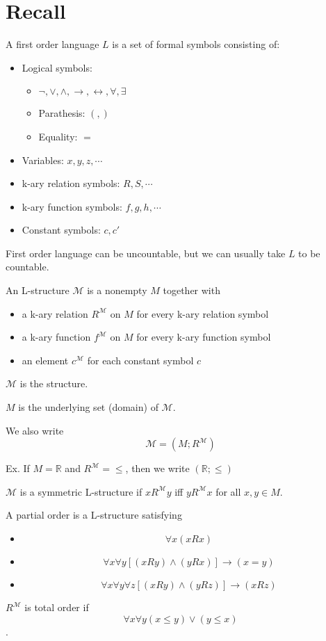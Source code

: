 \documentclass[11pt]{article}
\begin{document}
	\section{Recall}
	A first order language $L$ is a set of formal symbols consisting of:
	\begin{itemize}
		\item Logical symbols: 
		\begin{itemize} 
			\item $\neg, \vee, \wedge, \rightarrow, \leftrightarrow, \forall, \exists$
			\item Parathesis: $(, )$
			\item Equality: $=$
		\end{itemize}
		\item Variables: $x, y, z,\cdots$
		\item k-ary relation symbols: $R, S, \cdots$
		\item k-ary function symbols: $f, g, h, \cdots$
		\item Constant symbols: $c, c'$
	\end{itemize}
	
	First order language can be uncountable, but we can usually take $L$ to be countable.
	
	An L-structure $\mathcal{M}$ is a nonempty $M$ together with 
	\begin{itemize}
		\item a k-ary relation $R^{\mathcal{M}}$ on $M$ for every k-ary relation symbol
		\item a k-ary function $f^{\mathcal{M}}$ on $M$ for every k-ary function symbol
		\item an element $c^{\mathcal{M}}$ for each constant symbol $c$
	\end{itemize}
	
	$\mathcal{M}$ is the structure.
	
	$M$ is the underlying set (domain) of $\mathcal{M}$.
	
	We also write 
	\[\mathcal{M} = (M; R^{\mathcal{M}})\]
	
	Ex. If $M = \mathbb{R}$ and $R^{\mathcal{M}} = \leq$, then we write $(\mathbb{R}; \leq)$
	
	\begin{definition}
		$\mathcal{M}$ is a symmetric L-structure if $xR^{\mathcal{M}}y$ iff $yR^{\mathcal{M}}x$ for all $x, y \in M$.
	\end{definition}
	
	\begin{definition}
		A partial order is a L-structure satisfying
		\begin{itemize}
			\item \[\forall x (xRx)\]
			\item \[\forall x \forall y [ (xRy) \wedge (yRx)] \rightarrow (x = y)\]
			\item \[\forall x \forall y \forall z [(xRy) \wedge (yRz)] \rightarrow (xRz)\]
		\end{itemize}
	\end{definition}
	
	\begin{definition}
		$R^{\mathcal{M}}$ is total order if 
		\[\forall x \forall y (x \leq y) \vee (y \leq x)\].
	\end{definition}
\end{document}
